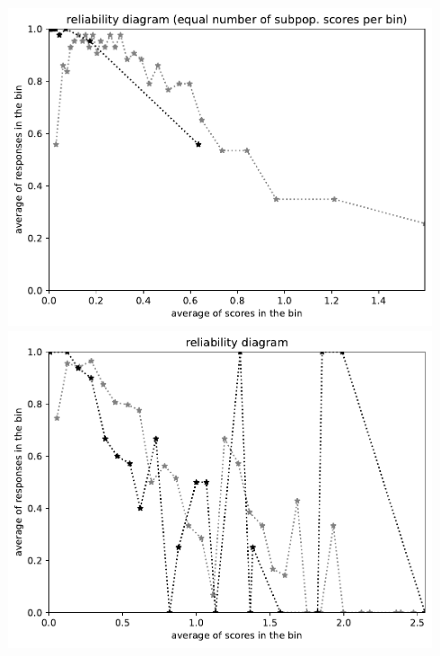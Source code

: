 \documentclass{article}
\newlength{\vertsep}
\newlength{\imsize}
\begin{document}
\begin{figure}
\begin{centering}
\parbox{\imsize}{\includegraphics[width=\imsize]
{../codes/unweighted/nll-1-323-monarch-monarch-butterfly-milkweed-butterfly-Danaus-plexippus_342-wild-boar-boar-Sus-scrofaequisamps30.pdf}}
\quad\quad
\parbox{\imsize}{\includegraphics[width=\imsize]
{../codes/unweighted/nll-1-323-monarch-monarch-butterfly-milkweed-butterfly-Danaus-plexippus_342-wild-boar-boar-Sus-scrofaequiscore30.pdf}}

\vspace{\vertsep}


\end{centering}
\end{figure}
\end{document}
